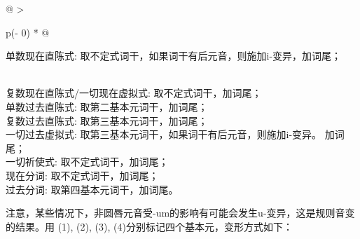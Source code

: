 \begin{longtable}[]{@{}
  >{\raggedright\arraybackslash}p{(\columnwidth - 0\tabcolsep) * }@{}}
  \toprule\noalign{}
  \begin{minipage}[b]{\linewidth}\raggedright
    单数现在直陈式: 取不定式词干，如果词干有后元音，则施加i-变异，加词尾；
  \end{minipage} \\
  \midrule\noalign{}
  \endhead
  \bottomrule\noalign{}
  \endlastfoot
  复数现在直陈式/一切现在虚拟式: 取不定式词干，加词尾；                 \\
  单数过去直陈式: 取第二基本元词干，加词尾；                            \\
  复数过去直陈式: 取第三基本元词干，加词尾；                            \\
  一切过去虚拟式: 取第三基本元词干，如果词干有后元音，则施加i-变异。
  加词尾；                                                              \\
  一切祈使式: 取不定式词干，加词尾；                                    \\
  现在分词: 取不定式词干，加词尾；                                      \\
  过去分词: 取第四基本元词干，加词尾。                                  \\
\end{longtable}

注意，某些情况下，非圆唇元音受-um的影响有可能会发生u-变异，这是规则音变的结果。用
(1), (2), (3), (4)分别标记四个基本元，变形方式如下：

